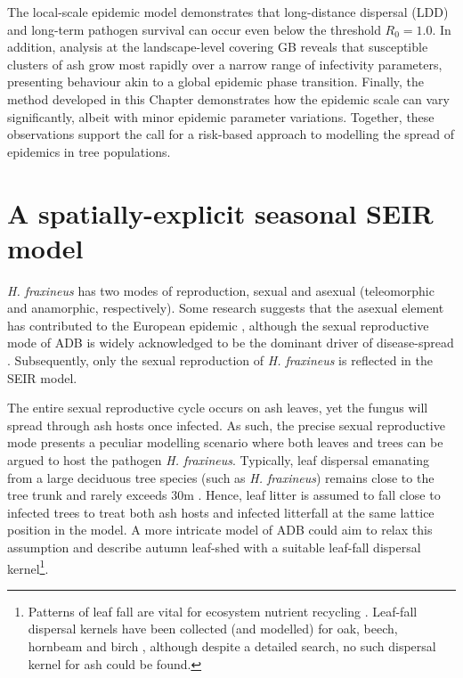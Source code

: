 The local-scale epidemic model demonstrates that long-distance dispersal (LDD) and long-term pathogen survival 
can occur even below the threshold $R_0=1.0$. In addition, analysis at the landscape-level covering GB reveals 
that susceptible clusters of ash grow most rapidly over a narrow range of infectivity parameters, 
presenting behaviour akin to a global epidemic phase transition.
Finally, the method developed in this Chapter demonstrates how the epidemic scale can vary significantly, 
albeit with minor epidemic parameter variations. Together, these observations support the call for a risk-based approach to modelling the spread of epidemics in tree populations.

\section{A spatially-explicit seasonal SEIR model}
\label{sec:seir-model}

\textit{H. fraxineus} has two modes of reproduction, sexual and asexual (teleomorphic and anamorphic, respectively). Some research suggests that the asexual element has contributed to the European epidemic \cite{fones2016role}, although the sexual reproductive mode of ADB is widely acknowledged to be the dominant driver of disease-spread 
\cite{https://doi.org/10.1111/ppa.12844, havnavckova2017direct, gross2012reproductive, Timmermann2011elal}.
Subsequently, only the sexual reproduction of \textit{H. fraxineus} is reflected in the SEIR model.

The entire sexual reproductive cycle occurs on ash leaves, yet the fungus will spread through ash hosts once infected. 
As such, the precise sexual reproductive mode presents a peculiar modelling scenario where both leaves and trees can be argued
to host the pathogen \textit{H. fraxineus}. 
Typically, leaf dispersal emanating from a large deciduous tree species (such as \textit{H. fraxineus}) remains close
to the tree trunk and rarely exceeds $30\mathrm{m}$ \cite{nickmans2019modelling}. Hence, leaf litter is assumed to fall close
to infected trees to treat both ash hosts and infected litterfall at the same lattice position in the model. 
A more intricate model of ADB could aim to relax this assumption and describe autumn leaf-shed with a suitable leaf-fall dispersal kernel\footnote{
    Patterns of leaf fall are vital for ecosystem nutrient recycling \cite{staelens2003model}. 
    Leaf-fall dispersal kernels have been collected (and modelled) for oak, beech, hornbeam and birch \cite{nickmans2019modelling},
    although despite a detailed search, no such dispersal kernel for ash could be found.
}.

